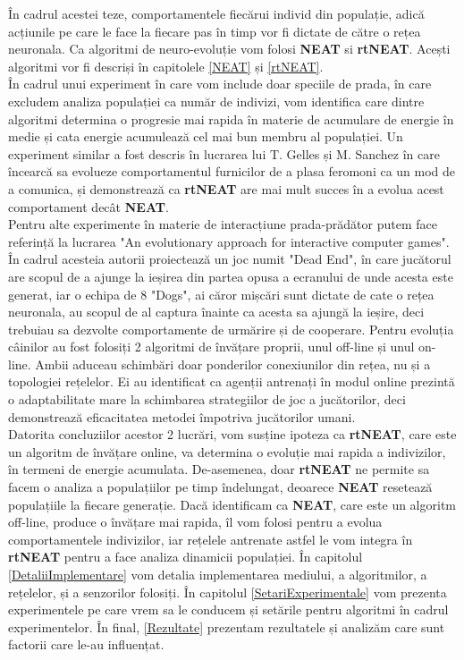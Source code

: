 În cadrul acestei teze, comportamentele fiecărui individ din populație, adică acțiunile pe care le face la fiecare pas în timp vor fi dictate de către o rețea neuronala. Ca algoritmi de neuro-evoluție vom folosi \textbf{NEAT} si \textbf{rtNEAT}. Acești algoritmi vor fi descriși în capitolele \ref{NEAT} și \ref{rtNEAT}. 
\\În cadrul unui experiment în care vom include doar speciile de prada, în care excludem analiza populației ca număr de indivizi, vom identifica care dintre algoritmi determina o progresie mai rapida în materie de acumulare de energie în medie și cata energie acumulează cel mai bun membru al populației. Un experiment similar a fost descris în lucrarea lui T. Gelles și M. Sanchez\cite{ants} în care încearcă sa evolueze comportamentul furnicilor de a plasa feromoni ca un mod de a comunica, și demonstrează ca \textbf{rtNEAT} are mai mult succes în a evolua acest comportament decât \textbf{NEAT}.\\
Pentru alte experimente în materie de interacțiune prada-prădător putem face referință la lucrarea "An evolutionary approach for interactive computer games"\cite{DeadEndGame}. În cadrul acesteia autorii proiectează un joc numit "Dead End", în care jucătorul are scopul de a ajunge la ieșirea din partea opusa a ecranului de unde acesta este generat, iar o echipa de 8 "Dogs", ai căror mișcări sunt dictate de cate o rețea neuronala, au scopul de al captura înainte ca acesta sa ajungă la ieșire, deci trebuiau sa dezvolte comportamente de urmărire și de cooperare. Pentru evoluția câinilor au fost folosiți 2 algoritmi de învățare proprii, unul off-line și unul on-line. Ambii aduceau schimbări doar ponderilor conexiunilor din rețea, nu și a topologiei rețelelor. Ei au identificat ca agenții antrenați în modul online prezintă o adaptabilitate mare la schimbarea strategiilor de joc a jucătorilor, deci demonstrează eficacitatea metodei împotriva jucătorilor umani.\\
Datorita concluziilor acestor 2 lucrări, vom susține ipoteza ca \textbf{rtNEAT}, care este un algoritm de învățare online, va determina o evoluție mai rapida a indivizilor, în termeni de energie acumulata. De-asemenea, doar \textbf{rtNEAT} ne permite sa facem o analiza a populațiilor pe timp îndelungat, deoarece \textbf{NEAT} resetează populațiile la fiecare generație.
Dacă identificam ca \textbf{NEAT}, care este un algoritm off-line, produce o învățare mai rapida, îl vom folosi pentru a evolua comportamentele indivizilor, iar rețelele antrenate astfel le vom integra în \textbf{rtNEAT} pentru a face analiza dinamicii populației.
În capitolul \ref{DetaliiImplementare} vom detalia implementarea mediului, a algoritmilor, a rețelelor, și a senzorilor folosiți. În capitolul \ref{SetariExperimentale} vom prezenta experimentele pe care vrem sa le conducem și setările pentru algoritmi în cadrul experimentelor. În final, \ref{Rezultate} prezentam rezultatele și analizăm care sunt factorii care le-au influențat.
